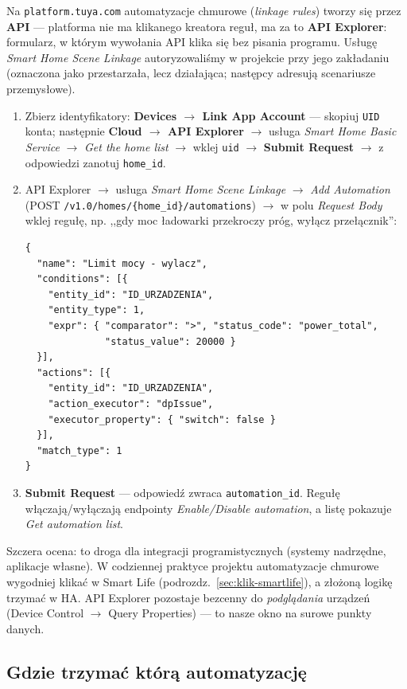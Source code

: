 \documentclass[11pt,a4paper]{article}
\begin{document}
Na \texttt{platform.tuya.com} automatyzacje chmurowe (\emph{linkage rules}) tworzy się przez \textbf{API} --- platforma nie ma klikanego kreatora reguł, ma za to \textbf{API Explorer}: formularz, w którym wywołania API klika się bez pisania programu. Usługę \emph{Smart Home Scene Linkage} autoryzowaliśmy w projekcie przy jego zakładaniu (oznaczona jako przestarzała, lecz działająca; następcy adresują scenariusze przemysłowe).

\begin{enumerate}
\item Zbierz identyfikatory: \textbf{Devices $\to$ Link App Account} --- skopiuj \texttt{UID} konta; następnie \textbf{Cloud $\to$ API Explorer} $\to$ usługa \emph{Smart Home Basic Service} $\to$ \emph{Get the home list} $\to$ wklej \texttt{uid} $\to$ \textbf{Submit Request} $\to$ z odpowiedzi zanotuj \texttt{home\_id}.
\item API Explorer $\to$ usługa \emph{Smart Home Scene Linkage} $\to$ \emph{Add Automation} (POST \texttt{/v1.0/homes/\{home\_id\}/automations}) $\to$ w polu \emph{Request Body} wklej regułę, np. ,,gdy moc ładowarki przekroczy próg, wyłącz przełącznik'':
\begin{lstlisting}
{
  "name": "Limit mocy - wylacz",
  "conditions": [{
    "entity_id": "ID_URZADZENIA",
    "entity_type": 1,
    "expr": { "comparator": ">", "status_code": "power_total",
              "status_value": 20000 }
  }],
  "actions": [{
    "entity_id": "ID_URZADZENIA",
    "action_executor": "dpIssue",
    "executor_property": { "switch": false }
  }],
  "match_type": 1
}
\end{lstlisting}
\item \textbf{Submit Request} --- odpowiedź zwraca \texttt{automation\_id}. Regułę włączają/wyłączają endpointy \emph{Enable/Disable automation}, a listę pokazuje \emph{Get automation list}.
\end{enumerate}

Szczera ocena: to droga dla integracji programistycznych (systemy nadrzędne, aplikacje własne). W codziennej praktyce projektu automatyzacje chmurowe wygodniej klikać w Smart Life (podrozdz.~\ref{sec:klik-smartlife}), a złożoną logikę trzymać w HA. API Explorer pozostaje bezcenny do \emph{podglądania} urządzeń (Device Control $\to$ Query Properties) --- to nasze okno na surowe punkty danych.

\subsection{Gdzie trzymać którą automatyzację}
\label{sec:klik-gdzie}
\end{document}

